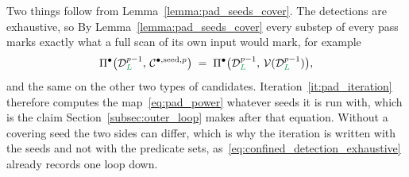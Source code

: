 \documentclass[a4paper, 12pt]{article}
\makeatletter
\newcommand{\robert}[1]{{\color{orange} #1}}
\newcommand{\detectV}{\Pi^{\bullet}}                             %
\DeclareRobustCommand{\candV}[1][]{\mathcal{C}^{\bullet\ifx\@empty#1\@empty\else,#1\fi}}
\newcommand{\green}{\color{ForestGreen}}
\newcommand{\V}{\mathcal{V}}
\renewcommand{\L}{{\green L}}
\theoremstyle{definition}
\theoremstyle{plain}
\numberwithin{equation}{section}
\newcommand{\tobecut}[1]{{\color{red} #1}}     %
\DeclareRobustCommand{\domseq}[1][]{\mathcal{D}\ifx\@empty#1\@empty\else_{#1}\fi}
\makeatother
\begin{document}
\tobecut{Two things follow from Lemma~\ref{lemma:pad_seeds_cover}. The detections are exhaustive, so}\robert{By Lemma~\ref{lemma:pad_seeds_cover}} every substep of every pass marks exactly what a full scan of its own input would mark, for example
\begin{equation}
    \label{eq:pad_detection_exhaustive}
    \detectV \big( \domseq[\L]^{p-1}, \, \candV[\mathrm{seed},p] \big) \; = \; \detectV \big( \domseq[\L]^{p-1}, \, \V(\domseq[\L]^{p-1}) \big) ,
\end{equation}
and the same on the other two types of candidates.
\tobecut{Iteration~\ref{it:pad_iteration} therefore computes the map~\eqref{eq:pad_power} whatever seeds it is run with, which is the claim Section~\ref{subsec:outer_loop} makes after that equation. Without a covering seed the two sides can differ, which is why the iteration is written with the seeds and not with the predicate sets, as~\eqref{eq:confined_detection_exhaustive} already records one loop down.}
\end{document}

